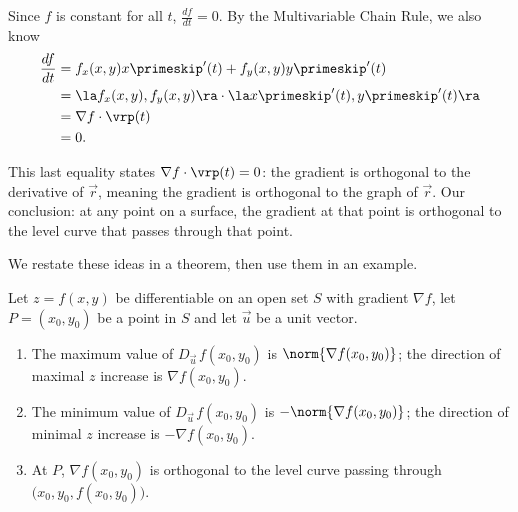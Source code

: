 Since $f$ is constant for all $t$, $\frac{df}{dt} = 0$. By the Multivariable Chain Rule, we also know
\begin{align*}
\frac{df}{dt} &= f_x(x,y)x\primeskip'(t) + f_y(x,y)y\primeskip'(t)\\						
						&= \la f_x(x,y),f_y(x,y)\ra \cdot \la x\primeskip'(t),y\primeskip'(t)\ra\\
						&= \nabla f \cdot \vrp(t)\\
						&=0.
\end{align*}

This last equality states $\nabla f \cdot \vrp(t) = 0$: the gradient is orthogonal to the derivative of $\vec r$, meaning the gradient is orthogonal to the graph of $\vec r$. Our conclusion: at any point on a surface, the gradient at that point is orthogonal to the level curve that passes through that point.

We restate these ideas in a theorem, then use them in an example.

{Let $z=f(x,y)$ be differentiable on an open set $S$ with gradient $\nabla f$, let $P=(x_0,y_0)$ be a point in $S$ and let $\vec u$ be a unit vector.
\begin{enumerate}
	\item The maximum value of $D_{\vec u\,}f(x_0,y_0)$ is $\norm{\nabla f(x_0,y_0)}$; the direction of maximal $z$ increase is $\nabla f(x_0,y_0)$.
	\item   The minimum value of $D_{\vec u\,}f(x_0,y_0)$ is $-\norm{\nabla f(x_0,y_0)}$; the direction of minimal $z$ increase is $-\nabla f(x_0,y_0)$.
	\item At $P$, $\nabla f(x_0,y_0)$ is orthogonal to the level curve passing through $\big(x_0,y_0,f(x_0,y_0)\big)$.
\end{enumerate}
}

